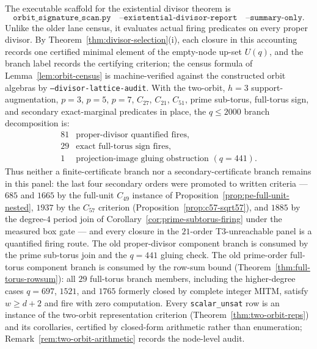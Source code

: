 \documentclass[11pt]{article}
\theoremstyle{plain}
\theoremstyle{definition}
\theoremstyle{remark}
\begin{document}
The executable scaffold for the existential divisor theorem is
\[
\texttt{orbit\_signature\_scan.py}\quad
\texttt{--existential-divisor-report}\quad
\texttt{--summary-only}.
\]
Unlike the older lane census, it evaluates actual firing predicates on every
proper divisor.  By Theorem~\ref{thm:divisor-selection}(i), each closure in
this accounting records one certified minimal element of the empty-node
up-set $U(q)$, and the branch label records the certifying criterion; the
census formula of Lemma~\ref{lem:orbit-census} is machine-verified against
the constructed orbit algebras by
\texttt{--divisor-lattice-audit}.  With the two-orbit, $h=3$ support-augmentation, $p=3$, $p=5$, $p=7$,
$C_{27}$, $C_{21}$, $C_{51}$, prime sub-torus, full-torus sign, and secondary
exact-marginal predicates in place, the $q\le2000$ branch decomposition is:
\[
\begin{array}{rl}
81 & \text{proper-divisor quantified fires},\\
29 & \text{exact full-torus sign fires},\\
1  & \text{projection-image gluing obstruction }(q=441).
\end{array}
\]
Thus neither a finite-certificate branch nor a secondary-certificate
branch remains in this panel: the last four secondary orders were
promoted to written criteria --- $685$ and $1665$ by the full-unit
$C_{49}$ instance of Proposition~\ref{prop:pe-full-unit-nested}, $1937$
by the $C_{57}$ criterion (Proposition~\ref{prop:c57-sqrt57}), and
$1885$ by the degree-$4$ period join of
Corollary~\ref{cor:prime-subtorus-firing} under the measured box gate
--- and every closure in the $21$-order T3-unreachable panel is a
quantified firing route.  The old proper-divisor
component branch is consumed by the prime sub-torus join and the $q=441$
gluing check.  The old prime-order full-torus component branch is consumed
by the row-sum bound (Theorem~\ref{thm:full-torus-rowsum}): all $29$
full-torus branch members, including the higher-degree cases $q=697$,
$1521$, and $1765$ formerly closed by complete integer MITM, satisfy
$w\ge d+2$ and fire with zero computation.  Every \texttt{scalar\_unsat} row is an instance of the
two-orbit representation criterion (Theorem~\ref{thm:two-orbit-reps}) and
its corollaries, certified by closed-form arithmetic rather than
enumeration; Remark~\ref{rem:two-orbit-arithmetic} records the node-level
audit.
\end{document}
